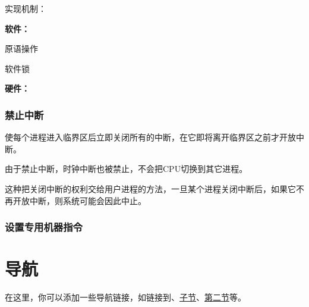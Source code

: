 \documentclass{ctexart}
\begin{document}
实现机制：

\textbf{软件：}

原语操作

软件锁

\textbf{硬件：}

\subsubsection{禁止中断}

使每个进程进入临界区后立即关闭所有的中断，在它即将离开临界区之前才开放中断。

由于禁止中断，时钟中断也被禁止，不会把CPU切换到其它进程。

这种把关闭中断的权利交给用户进程的方法，一旦某个进程关闭中断后，如果它不再开放中断，则系统可能会因此中止。

\subsubsection{设置专用机器指令}



\clearpage

\section*{导航}
\label{sec:navigation}

在这里，你可以添加一些导航链接，如链接到、\hyperref[subsec:sub]{子节}、\hyperref[sec:second]{第二节}等。
\end{document}
